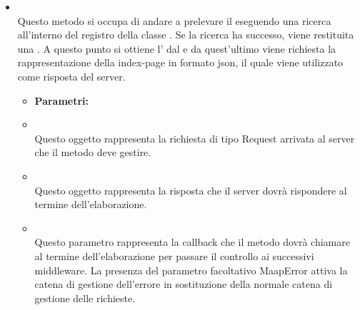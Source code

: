 \begin{itemize}
\item[] \textbf{} \\ Questo metodo si occupa di andare a prelevare il  eseguendo una ricerca all'interno del registro della classe . Se la ricerca ha successo, viene restituita una . A questo punto si ottiene l'  dal  e da quest'ultimo viene richiesta la rappresentazione della index-page in formato json, il quale viene utilizzato come risposta del server.
\begin{itemize}\addtolength{\itemsep}{-0.5\baselineskip}
\item[] \textbf{Parametri:}
\item[]  \\ Questo oggetto rappresenta la richiesta di tipo Request arrivata al server che il metodo deve gestire.
\item[]  \\ Questo oggetto rappresenta la risposta che il server dovrà rispondere al termine dell'elaborazione.
\item[]  \\ Questo parametro rappresenta la callback che il metodo dovrà chiamare al termine dell'elaborazione per passare il controllo ai successivi middleware. La presenza del parametro facoltativo MaapError attiva la catena di gestione dell'errore in sostituzione della normale catena di gestione delle richieste.
\end{itemize}
\end{itemize}

